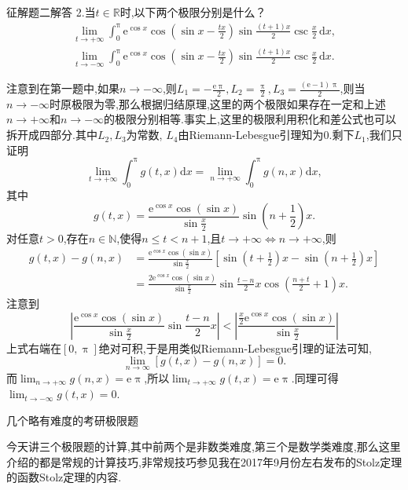 \documentclass[UTF8,no-math,12pt,openany,table,dvipsnames,svgnames]{book}
\renewcommand{\pi}{\uppi}
\newcommand{\hei}{\CJKfamily{hei}}
\newenvironment{solve}{\par\indent{\hei 解}\hspace{1em}}{\par}
\renewcommand{\le}{\leqslant}
\begin{document}
\begin{MYBOX}[colbacktitle=blue]{征解题二解答}
2.当$t\in\mathbb R$时,以下两个极限分别是什么？
\begin{gather*}
\lim_{t\to+\infty}\int_0^\pi\mathrm e^{\cos x}\cos\left(\sin x-\frac{tx}2\right)\sin\frac{(t+1)x}2\csc\frac x2\,\mathrm dx,\\
\lim_{t\to-\infty}\int_0^\pi\mathrm e^{\cos x}\cos\left(\sin x-\frac{tx}2\right)\sin\frac{(t+1)x}2\csc\frac x2\,\mathrm dx.
\end{gather*}
\tcblower
\begin{solve}
注意到在第一题中,如果$n\to-\infty$,则$L_1=-\frac{\mathrm e\pi}2,L_2=\frac\pi2,L_3=\frac{(\mathrm e-1)\pi}2$,则当$n\to-\infty$时原极限为零,那么根据归结原理,这里的两个极限如果存在一定和上述$n\to+\infty$和$n\to-\infty$的极限分别相等.事实上,这里的极限利用积化和差公式也可以拆开成四部分.其中$L_2,L_3$为常数, $L_4$由Riemann-Lebesgue引理知为$0$.剩下$L_1$,我们只证明
\[
\lim_{t\rightarrow +\infty} \int_0^{\pi}{g\left( t,x \right) \text{d}x}=\lim_{n\rightarrow +\infty} \int_0^{\pi}{g\left( n,x \right) \text{d}x},\]
其中\[
g\left( t,x \right) =\frac{\text{e}^{\cos x}\cos \left( \sin x \right)}{\sin \frac{x}{2}}\sin \left( n+\frac{1}{2} \right) x.
\]
对任意$t>0$,存在$n\in\mathbb N$,使得$n\le t<n+1$,且$t\to+\infty\Leftrightarrow n\to+\infty$,则
\begin{align*}
g\left( t,x \right) -g\left( n,x \right) &=\frac{\text{e}^{\cos x}\cos \left( \sin x \right)}{\sin \frac{x}{2}}\left[ \sin \left( t+\frac{1}{2} \right) x-\sin \left( n+\frac{1}{2} \right) x \right]\\
&=\frac{\text{2e}^{\cos x}\cos \left( \sin x \right)}{\sin \frac{x}{2}}\sin \frac{t-n}{2}x\cos \left( \frac{n+t}{2}+1 \right) x.
\end{align*}
注意到\[
\left| \frac{\text{e}^{\cos x}\cos \left( \sin x \right)}{\sin \frac{x}{2}}\sin \frac{t-n}{2}x \right|<\left| \frac{\frac{x}{2}\text{e}^{\cos x}\cos \left( \sin x \right)}{\sin \frac{x}{2}} \right|
\]
上式右端在$[0,\pi]$绝对可积,于是用类似Riemann-Lebesgue引理的证法可知,
\[
\lim_{n\rightarrow \infty} \left[ g\left( t,x \right) -g\left( n,x \right) \right] =0.
\]
而$\lim_{n\to+\infty}g(n,x)=\mathrm e\pi$,所以$\lim_{t\to+\infty}g(t,x)=\mathrm e\pi$.同理可得$\lim_{t\to-\infty}g(t,x)=0$.
\end{solve}
\end{MYBOX}
\centerline{\kaishu{}几个略有难度的考研极限题}
今天讲三个极限题的计算,其中前两个是非数类难度,第三个是数学类难度,那么这里介绍的都是常规的计算技巧,非常规技巧参见我在2017年9月份左右发布的Stolz定理的函数Stolz定理的内容.
\end{document}
